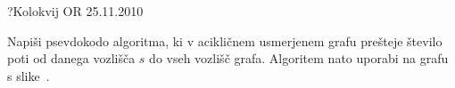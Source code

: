 \begin{naloga}{?}{Kolokvij OR 25.11.2010}
\begin{vprasanje}
Napiši psevdokodo algoritma,
ki v acikličnem usmerjenem grafu prešteje število poti
od danega vozlišča $s$ do vseh vozlišč grafa.
Algoritem nato uporabi na grafu s slike~\fig.

\begin{slika}
\pgfslika
{}
\end{slika}
\end{vprasanje}
\begin{odgovor}
\end{odgovor}
\end{naloga}
